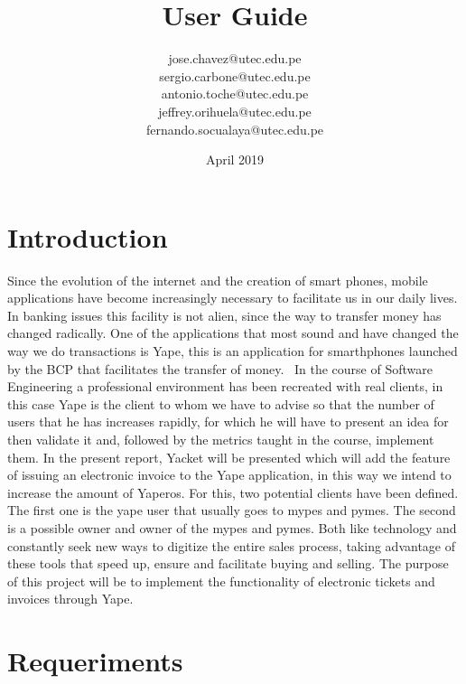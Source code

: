 \documentclass{article}
\title{User Guide}
\author{jose.chavez@utec.edu.pe \\ sergio.carbone@utec.edu.pe\\antonio.toche@utec.edu.pe\\jeffrey.orihuela@utec.edu.pe\\fernando.socualaya@utec.edu.pe}
\date{April 2019}
\begin{document}
\maketitle

\section{Introduction}
Since the evolution of the internet and the creation of smart phones, mobile applications have become increasingly necessary to facilitate us in our daily lives. In banking issues this facility is not alien, since the way to transfer money has changed radically. One of the applications that most sound and have changed the way we do transactions is Yape, this is an application for smarthphones launched by the BCP that facilitates the transfer of money.
 In the course of Software Engineering a professional environment has been recreated with real clients, in this case Yape is the client to whom we have to advise so that the number of users that he has increases rapidly, for which he will have to present an idea for then validate it and, followed by the metrics taught in the course, implement them. In the present report, Yacket will be presented which will add the feature of issuing an electronic invoice to the Yape application, in this way we intend to increase the amount of Yaperos.
For this, two potential clients have been defined. The first one is the yape user that usually goes to mypes and pymes. The second is a possible owner and owner of the mypes and pymes. Both like technology and constantly seek new ways to digitize the entire sales process, taking advantage of these tools that speed up, ensure and facilitate buying and selling.
The purpose of this project will be to implement the functionality of electronic tickets and invoices through Yape.


\section{Requeriments}
\end{document}
